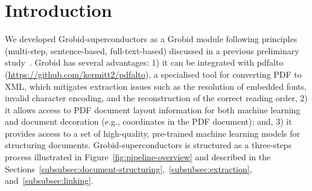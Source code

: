 \section{Introduction}



We developed Grobid-superconductors as a Grobid module following principles (multi-step, sentence-based, full-text-based) discussed in a previous preliminary study~\cite{foppiano:hal-02870896}.
Grobid has several advantages: 1) it can be integrated with pdfalto (\url{https://github.com/kermitt2/pdfalto}), a specialised tool for converting PDF to XML, which mitigates extraction issues such as the resolution of embedded fonts, invalid character encoding, and the reconstruction of the correct reading order, 2) it allows access to PDF document layout information for both machine learning and document decoration (e.g., coordinates in the PDF document); and, 3) it provides access to a set of high-quality, pre-trained machine learning models for structuring documents.
Grobid-superconductors is structured as a three-steps process illustrated in Figure~\ref{fig:pipeline-overview} and described in the Sections~\ref{subsubsec:document-structuring},~\ref{subsubsec:extraction}, and~\ref{subsubsec:linking}.

